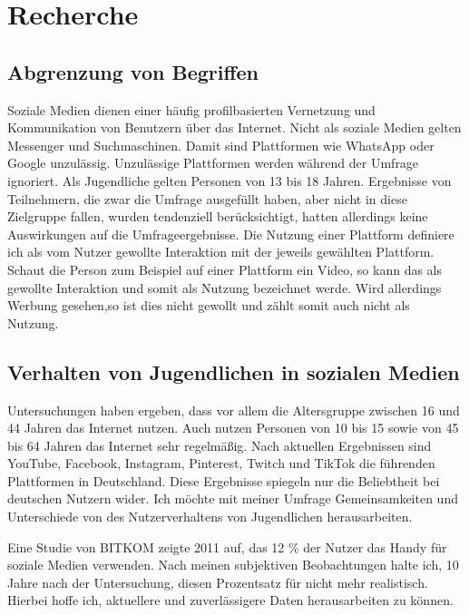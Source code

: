 \section{Recherche}

\subsection{Abgrenzung von Begriffen}

Soziale Medien dienen einer häufig profilbasierten Vernetzung und Kommunikation von Benutzern über das Internet\cite{Bendel}. Nicht als soziale Medien gelten Messenger und Suchmaschinen. Damit sind Plattformen wie WhatsApp oder Google unzulässig. Unzulässige Plattformen werden während der Umfrage ignoriert.
Als Jugendliche gelten Personen von 13 bis 18 Jahren. Ergebnisse von Teilnehmern, die zwar die Umfrage ausgefüllt haben, aber nicht in diese Zielgruppe fallen, wurden tendenziell berücksichtigt, hatten allerdings keine Auswirkungen auf die Umfrageergebnisse.
Die Nutzung einer Plattform definiere ich als vom Nutzer gewollte Interaktion mit der jeweils gewählten Plattform. Schaut die Person zum Beispiel auf einer Plattform ein Video, so kann das als gewollte Interaktion und somit als Nutzung bezeichnet werde. Wird allerdings Werbung gesehen,so ist dies nicht gewollt und zählt somit auch nicht als Nutzung.

\subsection{Verhalten von Jugendlichen in sozialen Medien}

Untersuchungen haben ergeben, dass vor allem die Altersgruppe zwischen 16 und 44 Jahren das Internet nutzen. Auch nutzen Personen von 10 bis 15 sowie von 45 bis 64 Jahren das Internet sehr regelmäßig\cite{11.August.2020}. Nach aktuellen Ergebnissen sind YouTube, Facebook, Instagram, Pinterest, Twitch und TikTok die führenden Plattformen in Deutschland\cite{Firsching10.November.2021}. Diese Ergebnisse spiegeln nur die Beliebtheit bei deutschen Nutzern wider. Ich möchte mit meiner Umfrage  Gemeinsamkeiten und Unterschiede von des Nutzerverhaltens von Jugendlichen herausarbeiten. 

Eine Studie von BITKOM zeigte 2011 auf, das 12 \% der Nutzer das Handy für soziale Medien verwenden\cite{Meindl20.Febuar.2012}. Nach meinen subjektiven Beobachtungen halte ich, 10 Jahre nach der Untersuchung, diesen Prozentsatz für nicht mehr realistisch. Hierbei hoffe ich, aktuellere und zuverlässigere Daten herausarbeiten zu können.


